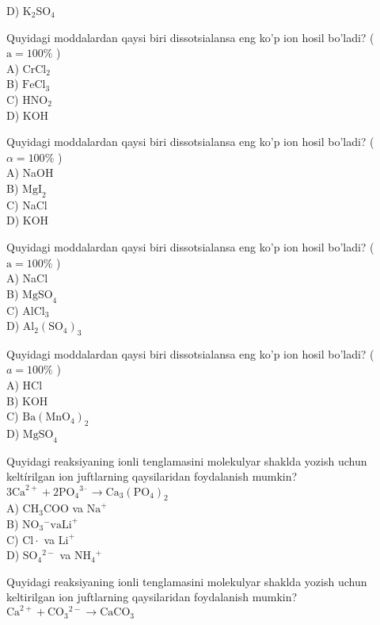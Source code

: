 D) $\mathrm{K}_{2} \mathrm{SO}_{4}$
  \item Quyidagi moddalardan qaysi biri dissotsialansa eng ko'p ion hosil bo'ladi? ( $\mathrm{a}=100 \%$ )\\
A) $\mathrm{CrCl}_{2}$\\
B) $\mathrm{FeCl}_{3}$\\
C) $\mathrm{HNO}_{2}$\\
D) KOH
  \item Quyidagi moddalardan qaysi biri dissotsialansa eng ko'p ion hosil bo'ladi? ( $\alpha=100 \%$ )\\
A) NaOH\\
B) $\mathrm{MgI}_{2}$\\
C) NaCl\\
D) KOH
  \item Quyidagi moddalardan qaysi biri dissotsialansa eng ko'p ion hosil bo'ladi? ( $\mathrm{a}=100 \%$ )\\
A) NaCl\\
B) $\mathrm{MgSO}_{4}$\\
C) $\mathrm{AlCl}_{3}$\\
D) $\mathrm{Al}_{2}\left(\mathrm{SO}_{4}\right)_{3}$
  \item Quyidagi moddalardan qaysi biri dissotsialansa eng ko'p ion hosil bo'ladi? ( $a=100 \%$ )\\
A) HCl\\
B) KOH\\
C) $\mathrm{Ba}\left(\mathrm{MnO}_{4}\right)_{2}$\\
D) $\mathrm{MgSO}_{4}$
  \item Quyidagi reaksiyaning ionli tenglamasini molekulyar shaklda yozish uchun keltírilgan ion juftlarning qaysilaridan foydalanish mumkin?\\
$3 \mathrm{Ca}^{2+}+2 \mathrm{PO}_{4}{ }^{3 \cdot} \rightarrow \mathrm{Ca}_{3}\left(\mathrm{PO}_{4}\right)_{2}$\\
A) $\mathrm{CH}_{3} \mathrm{COO}$ va $\mathrm{Na}^{+}$\\
B) $\mathrm{NO}_{3}{ }^{-} \mathrm{va} \mathrm{Li}^{+}$\\
C) $\mathrm{Cl} \cdot$ va $\mathrm{Li}^{+}$\\
D) $\mathrm{SO}_{4}{ }^{2-}$ va $\mathrm{NH}_{4}{ }^{+}$\\
  \item Quyidagi reaksiyaning ionli tenglamasini molekulyar shaklda yozish uchun keltirilgan ion juftlarning qaysilaridan foydalanish mumkin? $\mathrm{Ca}^{2+}+\mathrm{CO}_{3}{ }^{2-} \rightarrow \mathrm{CaCO}_{3}$\\

